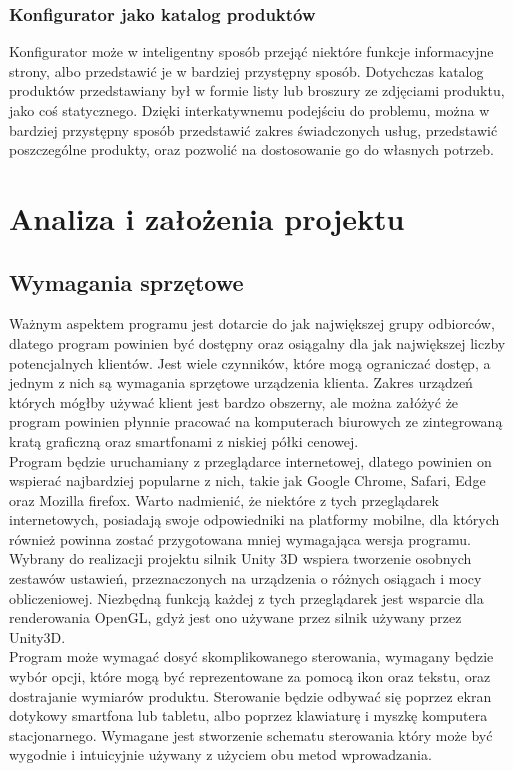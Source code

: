 \documentclass{article} %
\begin{document}
        \subsubsection{Konfigurator jako katalog produktów}
        Konfigurator może w inteligentny sposób przejąć niektóre funkcje informacyjne strony, albo przedstawić je w bardziej przystępny sposób. Dotychczas katalog produktów przedstawiany był w formie listy lub broszury ze zdjęciami produktu, jako coś statycznego. Dzięki interkatywnemu podejściu do problemu, można w bardziej przystępny sposób przedstawić zakres świadczonych usług, przedstawić poszczególne produkty, oraz pozwolić na dostosowanie go do własnych potrzeb.
        \\
        
\section{Analiza i założenia projektu}
    \subsection{Wymagania sprzętowe}
        Ważnym aspektem programu jest dotarcie do jak największej grupy odbiorców, dlatego program powinien być dostępny oraz osiągalny dla jak największej liczby potencjalnych klientów. Jest wiele czynników, które mogą ograniczać dostęp, a jednym z nich są wymagania sprzętowe urządzenia klienta. Zakres urządzeń których mógłby używać klient jest bardzo obszerny, ale można załóżyć że program powinien płynnie pracować na komputerach biurowych ze zintegrowaną kratą graficzną oraz smartfonami z niskiej półki cenowej.
        \\
        
        Program będzie uruchamiany z przeglądarce internetowej, dlatego powinien on wspierać najbardziej popularne z nich, takie jak Google Chrome, Safari, Edge oraz Mozilla firefox. Warto nadmienić, że niektóre z tych przeglądarek internetowych, posiadają swoje odpowiedniki na platformy mobilne, dla których również powinna zostać przygotowana mniej wymagająca wersja programu. Wybrany do realizacji projektu silnik Unity 3D wspiera tworzenie osobnych zestawów ustawień, przeznaczonych na urządzenia o różnych osiągach i mocy obliczeniowej. Niezbędną funkcją każdej z tych przeglądarek jest wsparcie dla renderowania OpenGL, gdyż jest ono używane przez silnik używany przez Unity3D.
        \\
        
        Program może wymagać dosyć skomplikowanego sterowania, wymagany będzie wybór opcji, które mogą być reprezentowane za pomocą ikon oraz tekstu, oraz dostrajanie wymiarów produktu. Sterowanie będzie odbywać się poprzez ekran dotykowy smartfona lub tabletu, albo poprzez klawiaturę i myszkę komputera stacjonarnego. Wymagane jest stworzenie schematu sterowania który może być wygodnie i intuicyjnie używany z użyciem obu metod wprowadzania.
        \\
        
\end{document}
